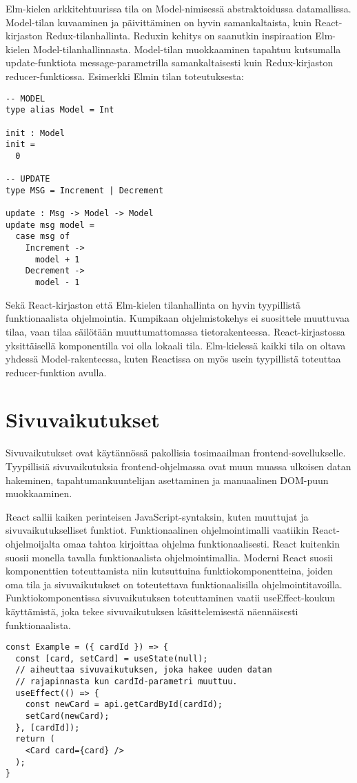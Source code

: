 Elm-kielen arkkitehtuurissa tila on Model-nimisessä abstraktoidussa datamallissa. Model-tilan kuvaaminen ja
päivittäminen on hyvin samankaltaista, kuin React-kirjaston Redux-tilanhallinta. Reduxin kehitys on saanutkin
inspiraation Elm-kielen Model-tilanhallinnasta. Model-tilan muokkaaminen tapahtuu kutsumalla update-funktiota
message-parametrilla samankaltaisesti kuin Redux-kirjaston reducer-funktiossa. \cite{elmlang} Esimerkki Elmin tilan
toteutuksesta:
\begin{verbatim}
-- MODEL
type alias Model = Int

init : Model
init =
  0

-- UPDATE
type MSG = Increment | Decrement

update : Msg -> Model -> Model
update msg model =
  case msg of
    Increment ->
      model + 1
    Decrement ->
      model - 1
\end{verbatim}

Sekä React-kirjaston että Elm-kielen tilanhallinta on hyvin tyypillistä funktionaalista ohjelmointia. Kumpikaan
ohjelmistokehys ei suosittele muuttuvaa tilaa, vaan tilaa säilötään muuttumattomassa tietorakenteessa. React-kirjastossa
yksittäisellä komponentilla voi olla lokaali tila. Elm-kielessä kaikki tila on oltava yhdessä Model-rakenteessa, kuten
Reactissa on myös usein tyypillistä toteuttaa reducer-funktion avulla.

\section{Sivuvaikutukset}
Sivuvaikutukset ovat käytännössä pakollisia tosimaailman frontend-sovellukselle. Tyypillisiä sivuvaikutuksia
frontend-ohjelmassa ovat muun muassa ulkoisen datan hakeminen, tapahtumankuuntelijan asettaminen ja manuaalinen DOM-puun
muokkaaminen.

React sallii kaiken perinteisen JavaScript-syntaksin, kuten muuttujat ja sivuvaikutukselliset funktiot. Funktionaalinen
ohjelmointimalli vaatiikin React-ohjelmoijalta omaa tahtoa kirjoittaa ohjelma funktionaalisesti. React kuitenkin suosii
monella tavalla funktionaalista ohjelmointimallia. Moderni React suosii komponenttien toteuttamista niin kutsuttuina
funktiokomponentteina, joiden oma tila ja sivuvaikutukset on toteutettava funktionaalisilla ohjelmointitavoilla.
Funktiokomponentissa sivuvaikutuksen toteuttaminen vaatii useEffect-koukun käyttämistä, joka tekee sivuvaikutuksen
käsittelemisestä näennäisesti funktionaalista. \cite{reactjs}
\begin{verbatim}
const Example = ({ cardId }) => {
  const [card, setCard] = useState(null);
  // aiheuttaa sivuvaikutuksen, joka hakee uuden datan
  // rajapinnasta kun cardId-parametri muuttuu.
  useEffect(() => {
    const newCard = api.getCardById(cardId);
    setCard(newCard);
  }, [cardId]);
  return (
    <Card card={card} />
  );
}
\end{verbatim}

